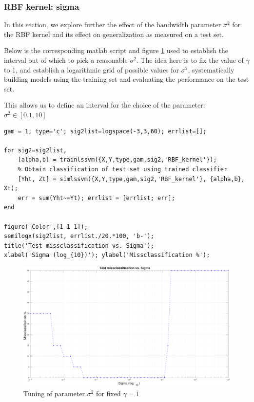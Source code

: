 \documentclass[11pt, a4paper]{article}
\begin{document}
\subsubsection{RBF kernel: sigma}

In this section, we explore further the effect of the bandwidth
parameter $\sigma^2$ for the RBF kernel and its effect on
generalization as measured on a test set.

Below is the corresponding matlab script and figure
\ref{fig:rbf_sigma} used to establish the interval out of which to
pick a reasonable $\sigma^2$. The idea here is to fix the value of
$\gamma$ to 1, and establish a logarithmic grid of possible values for
$\sigma^2$, systematically building models using the training set and
evaluating the performance on the test set. 

This allows us to define an interval for the choice of the parameter:
$\sigma^2 \in [0.1,10]$

\begin{lstlisting}
gam = 1; type='c'; sig2list=logspace(-3,3,60); errlist=[];

for sig2=sig2list,
    [alpha,b] = trainlssvm({X,Y,type,gam,sig2,'RBF_kernel'});
    % Obtain classification of test set using trained classifier
    [Yht, Zt] = simlssvm({X,Y,type,gam,sig2,'RBF_kernel'}, {alpha,b}, Xt);
    err = sum(Yht~=Yt); errlist = [errlist; err]; 
end

figure('Color',[1 1 1]);
semilogx(sig2list, errlist./20.*100, 'b-');
title('Test missclassification vs. Sigma');
xlabel('Sigma (log_{10})'); ylabel('Missclassification %');
\end{lstlisting}

\begin{figure}[H]
    \centering
    \includegraphics[scale=.40]{rbf_sigma.pdf}
    \caption{Tuning of parameter $\sigma^2$ for fixed $\gamma=1$}
    \label{fig:rbf_sigma}
\end{figure}
\end{document}
